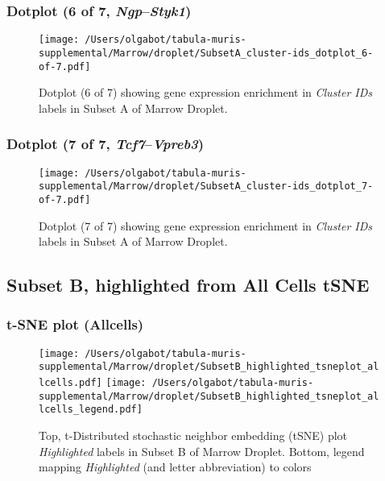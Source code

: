 \clearpage

\subsubsection{Dotplot (6 of 7, \emph{Ngp}--\emph{Styk1})}
\begin{figure}[h]
\centering
\texttt{[image: /Users/olgabot/tabula-muris-supplemental/Marrow/droplet/SubsetA\_cluster-ids\_dotplot\_6-of-7.pdf]}

\caption{ Dotplot (6 of 7)  showing gene expression enrichment in \emph{Cluster IDs} labels in Subset A of Marrow Droplet. }
\end{figure}


\clearpage

\subsubsection{Dotplot (7 of 7, \emph{Tcf7}--\emph{Vpreb3})}
\begin{figure}[h]
\centering
\texttt{[image: /Users/olgabot/tabula-muris-supplemental/Marrow/droplet/SubsetA\_cluster-ids\_dotplot\_7-of-7.pdf]}

\caption{ Dotplot (7 of 7)  showing gene expression enrichment in \emph{Cluster IDs} labels in Subset A of Marrow Droplet. }
\end{figure}


\clearpage
\subsection{Subset B, highlighted from All Cells tSNE}
\subsubsection{t-SNE plot (Allcells)}
\begin{figure}[h]
\centering
\texttt{[image: /Users/olgabot/tabula-muris-supplemental/Marrow/droplet/SubsetB\_highlighted\_tsneplot\_allcells.pdf]}
\texttt{[image: /Users/olgabot/tabula-muris-supplemental/Marrow/droplet/SubsetB\_highlighted\_tsneplot\_allcells\_legend.pdf]}
\caption{Top, t-Distributed stochastic neighbor embedding (tSNE) plot  \emph{Highlighted} labels in Subset B of Marrow Droplet. Bottom, legend mapping \emph{Highlighted} (and letter abbreviation) to colors}
\end{figure}


\clearpage

